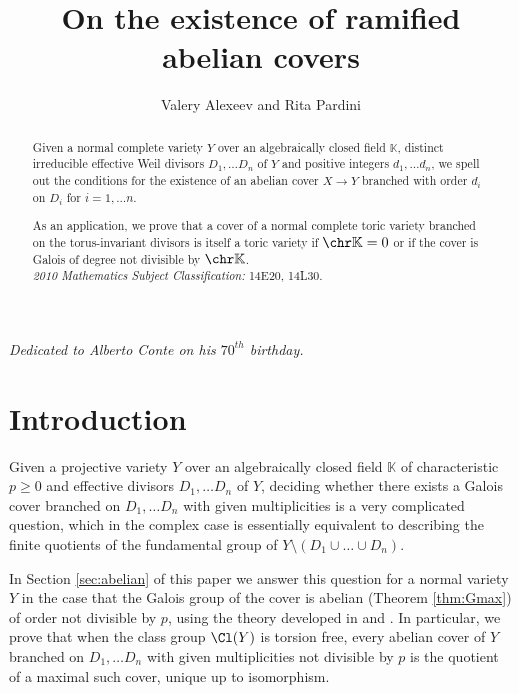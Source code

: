 \documentclass[10pt]{amsart}
\date{}
\author{Valery Alexeev and Rita Pardini}
\title{On the existence of ramified abelian covers}
\numberwithin{equation}{section}
\begin{document}
 

\begin{abstract}
  Given a normal complete   variety $Y$ over an algebraically closed field $\mathbb K$, distinct irreducible  effective  Weil divisors $D_1, \dots D_n$ of $Y$ and  positive  integers $d_1,\dots d_n$, we spell out the conditions  for the existence of an abelian cover $X\to Y$ branched with order $d_i$ on $D_i$ for $i=1,\dots n$.
  
  As an application, we   prove that a  cover of a  normal complete toric variety 
  branched on  the torus-invariant divisors is itself a toric variety if  $\chr \mathbb K=0$ or if the cover is Galois of degree not divisible by $\chr \mathbb K$.\\
 {\em  2010 Mathematics Subject Classification:} 14E20, 14L30.
  \end{abstract}


\maketitle


{\em Dedicated to Alberto  Conte on his $70^{th}$ birthday.}
\setcounter{tocdepth}{1}
\tableofcontents

\section{Introduction}
\label{sec:intro}

Given a  projective variety $Y$ over an algebraically closed field $\mathbb K$ of characteristic $p\ge 0$  and effective divisors $D_1,\dots D_n$ of $Y$,  deciding whether there exists a Galois cover branched on $D_1, \dots D_n$ with given multiplicities is a very  complicated question, which in the complex case is essentially equivalent to describing the finite quotients of the  fundamental group of $Y\setminus(D_1\cup\dots \cup D_n)$. 

In Section \ref{sec:abelian} of this paper we answer  this question
for a normal variety $Y$ in the case that  the Galois group of the
cover is  abelian (Theorem \ref{thm:Gmax}) of order not divisible by $p$, using  the theory developed in 
\cite{Pardini_AbelianCovers} and  \cite{AlexeevPardini_Covers}.
In particular, we prove that when the  class group $\Cl(Y)$ is torsion free, every abelian cover of $Y$ branched on $D_1, \dots D_n$ with given multiplicities not divisible by $p$ is the quotient of a maximal such cover, unique up to isomorphism. 
\end{document}
